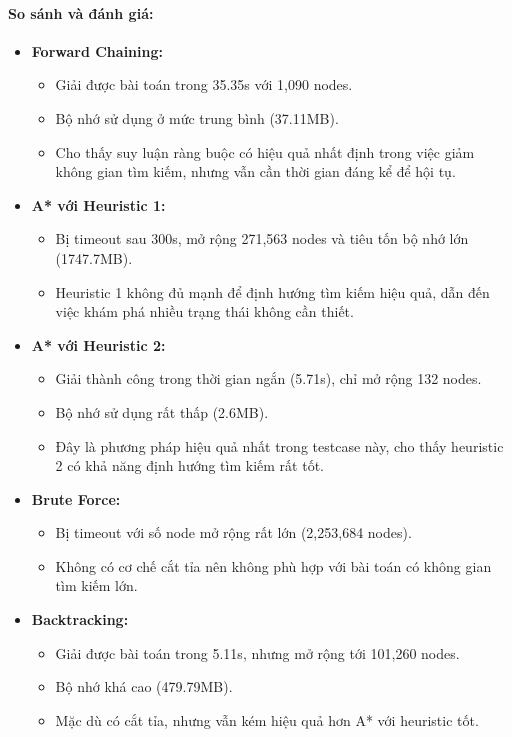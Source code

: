 \paragraph{So sánh và đánh giá:}
\begin{itemize}
\item \textbf{Forward Chaining:}
\begin{itemize}
    \item Giải được bài toán trong 35.35s với 1,090 nodes.
    \item Bộ nhớ sử dụng ở mức trung bình (37.11MB).
    \item Cho thấy suy luận ràng buộc có hiệu quả nhất định trong việc giảm không gian tìm kiếm, nhưng vẫn cần thời gian đáng kể để hội tụ.
\end{itemize}

\item \textbf{A* với Heuristic 1:}
\begin{itemize}
    \item Bị timeout sau 300s, mở rộng 271,563 nodes và tiêu tốn bộ nhớ lớn (1747.7MB).
    \item Heuristic 1 không đủ mạnh để định hướng tìm kiếm hiệu quả, dẫn đến việc khám phá nhiều trạng thái không cần thiết.
\end{itemize}

\item \textbf{A* với Heuristic 2:}
\begin{itemize}
    \item Giải thành công trong thời gian ngắn (5.71s), chỉ mở rộng 132 nodes.
    \item Bộ nhớ sử dụng rất thấp (2.6MB).
    \item Đây là phương pháp hiệu quả nhất trong testcase này, cho thấy heuristic 2 có khả năng định hướng tìm kiếm rất tốt.
\end{itemize}

\item \textbf{Brute Force:}
\begin{itemize}
    \item Bị timeout với số node mở rộng rất lớn (2,253,684 nodes).
    \item Không có cơ chế cắt tỉa nên không phù hợp với bài toán có không gian tìm kiếm lớn.
\end{itemize}

\item \textbf{Backtracking:}
\begin{itemize}
    \item Giải được bài toán trong 5.11s, nhưng mở rộng tới 101,260 nodes.
    \item Bộ nhớ khá cao (479.79MB).
    \item Mặc dù có cắt tỉa, nhưng vẫn kém hiệu quả hơn A* với heuristic tốt.
\end{itemize}

\end{itemize}

